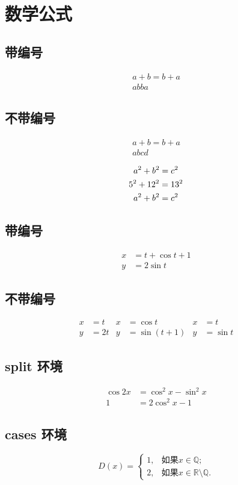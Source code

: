 \chapter{数学公式}
    \section{带编号}
    \begin{gather}
        a + b = b + a  \\ 
        ab ba
    \end{gather}

    \section{不带编号}
    \begin{gather*}
        a+b = b+a \\
        ab cd
    \end{gather*}

    \begin{gather}
        a^2 + b^2 = c^2  \notag \\
        5^2 + 12^2 = 13^2 \notag \\
        a^2 + b^2 = c^2
    \end{gather}

    \section{带编号}
    \begin{align}
        x & = t + \cos t + 1 \\
        y &= 2 \sin t
    \end{align}
    \section{不带编号}
    \begin{align*}
        x & = t & x & = \cos t & x & =t \\
        y & = 2t & y& =\sin(t+1) & y & = \sin t
    \end{align*}

    \section{split 环境} %
    \begin{equation}
        \begin{split}
            \cos 2x & = \cos^2 x -\sin^2 x \\
           1 &= 2 \cos^2 x -1
        \end{split}
    \end{equation}

    \section{cases 环境}
    \begin{equation}
    D(x) = \begin{cases}
        1, &\text{如果} x \in \mathbb{Q}; \\
        2, &\text{如果} x \in \mathbb{R}\setminus\mathbb{Q}.
    \end{cases}
    \end{equation}